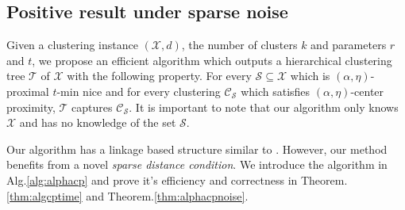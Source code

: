 \documentclass[anon,12pt]{colt2016} %
\newcommand{\mc}{\mathcal}
\begin{document}
\subsection{Positive result under sparse noise}
\label{section:positiveResultSparseNoise}
Given a clustering instance $(\mc X, d)$, the number of clusters $k$ and parameters $r$ and $t$, we propose an efficient algorithm which outputs a hierarchical clustering tree $\mc T$ of $\mc X$ with the following property. For every $\mc S \subseteq \mc X$ which is $(\alpha, \eta)$-proximal $t$-min nice and for every clustering $\mc C_{\mc S}$ which satisfies $(\alpha, \eta)$-center proximity, $\mc T$ captures $\mc C_{\mc S}$. It is important to note that our algorithm only knows $\mc X$ and has no knowledge of the set $\mc S$.

Our algorithm has a linkage based structure similar to \cite{balcan2012clustering}. However, our method benefits from a novel {\it sparse distance condition}.
We introduce the algorithm in Alg.\ref{alg:alphacp} and prove it's efficiency and correctness in Theorem. \ref{thm:algcptime} and Theorem.\ref{thm:alphacpnoise}. 


\end{document}
